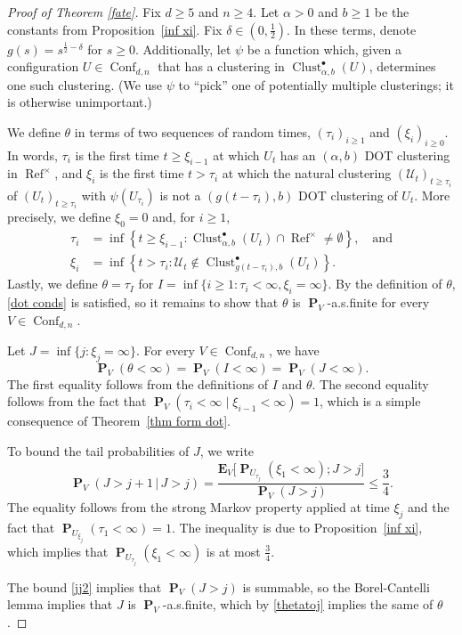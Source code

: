 \documentclass[11pt,reqno]{amsart}
\theoremstyle{definition}
\numberwithin{equation}{section}
\newcommand{\1}{\mathbf{1}}
\DeclareMathOperator{\PP}{\mathbf{P}}
\newcommand{\EE}{\mathbf{E}}
\DeclareMathOperator{\Refcon}{\mathrm{Ref}}
\newcommand{\UU}{\mathcal{U}}
\DeclareMathOperator{\Conf}{\mathrm{Conf}}
\DeclareMathOperator{\Clust}{\mathrm{Clust}}
\begin{document}
\begin{proof}[Proof of Theorem \ref{fate}]
Fix $d \geq 5$ and $n \geq 4$. Let $\alpha > 0$ and $b \geq 1$ be the constants from Proposition~\ref{inf xi}. Fix $\delta \in (0,\frac12)$. In these terms, denote $g(s) = s^{\frac12-\delta}$ for $s \geq 0$. Additionally, let $\psi$ be a function which, given a configuration $U \in \Conf_{d,n}$ that has a clustering in $\Clust_{\alpha,b}^\bullet (U)$, determines one such clustering. (We use $\psi$ to ``pick'' one of potentially multiple clusterings; it is otherwise unimportant.) 

We define $\theta$ in terms of two sequences of random times, $(\tau_i)_{i \geq 1}$ and $(\xi_i)_{i \geq 0}$. In words, $\tau_i$ is the first time $t \geq \xi_{i-1}$ at which $U_t$ has an $(\alpha,b)$ DOT clustering in $\Refcon^\times$, and $\xi_i$ is the first time $t > \tau_i$ at which the natural clustering $(\UU_t)_{t \geq \tau_i}$ of $(U_t)_{t \geq \tau_i}$ with $\psi (U_{\tau_i})$ is not a $(g(t-\tau_i),b)$ DOT clustering of $U_t$. More precisely, we define $\xi_0 = 0$ and, for $i \geq 1$,  
\begin{align*}
\tau_i &=  \inf \left\{t \geq \xi_{i-1}: \Clust_{\alpha,b}^\bullet (U_t) \cap \Refcon^\times \neq \emptyset \right\}, \quad \text{and}\\ 
\xi_i &= \inf \left\{t > \tau_i: \UU_t \notin \Clust_{ g(t-\tau_i),b}^\bullet (U_{t}) \right\}.
\end{align*}
Lastly, we define $\theta = \tau_I$ for $I = \inf \{i \geq 1: \tau_i < \infty, \xi_i = \infty\}$. By the definition of $\theta$, \eqref{dot conds} is satisfied, so it remains to show that $\theta$ is $\PP_V$-a.s.\@ finite for every $V \in \Conf_{d,n}$.

Let $J =\inf \{j : \xi_j = \infty\}$. For every $V \in \Conf_{d,n}$, we have
\begin{equation}\label{thetatoj}
\PP_V (\theta < \infty) = \PP_V (I < \infty) = \PP_V (J < \infty).
\end{equation}
The first equality follows from the definitions of $I$ and $\theta$. The second equality follows from the fact that $\PP_V (\tau_i < \infty \mid \xi_{i-1} < \infty) = 1$, which is a simple consequence of Theorem~\ref{thm form dot}. 

To bound the tail probabilities of $J$, we write
\begin{equation}\label{jj2}
\PP_V (J > j+1 \,|\, J > j) = \frac{\EE_V \big[ \PP_{U_{\tau_j}} (\xi_1 < \infty); J > j\big]}{\PP_V (J > j)} \leq \frac{3}{4}.
\end{equation}
The equality follows from the strong Markov property applied at time $\xi_j$ and the fact that $\PP_{U_{\xi_j}} (\tau_1 < \infty) = 1$. The inequality is due to Proposition~\ref{inf xi}, which implies that $\PP_{U_{\tau_j}} (\xi_1 < \infty)$ is at most $\frac34$.

The bound \eqref{jj2} implies that $\PP_V (J > j)$ is summable, so the Borel-Cantelli lemma implies that $J$ is $\PP_V$-a.s.\@ finite, which by \eqref{thetatoj} implies the same of $\theta$.
\end{proof}
\end{document}
